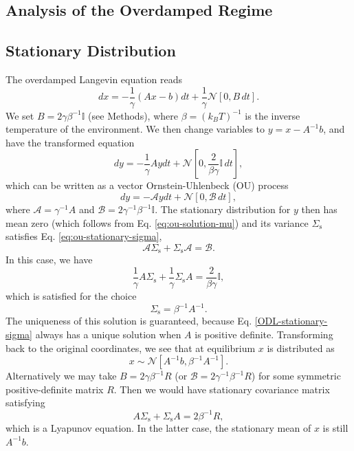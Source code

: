 \documentclass[prx,onecolumn,floatfix,longbibliography,notitlepage, nofootinbib]{revtex4-1}
\begin{document}
\begin{appendix}
\section{Analysis of the Overdamped Regime}

\subsection{Stationary Distribution}
The overdamped Langevin equation reads
\begin{equation}
    \label{eq:ODL-app}
    dx = - \frac{1}{\gamma}(A x - b) dt + \frac{1}{\gamma}\mathcal{N}\left[0,B\, dt\right].
\end{equation}
We set $B = 2 \gamma \beta^{-1} \mathbb{I}$ (see Methods), where $\beta =(k_B T)^{-1}$ is the inverse temperature of the environment. We then change variables to $y = x - A^{-1}b$, and have the transformed equation
\begin{equation}
    \label{ODL-transformed-app}
    dy = - \frac{1}{\gamma}A y dt + \mathcal{N}\left[0, \frac{2}{\beta \gamma} \mathbb{I}\, dt\right],
\end{equation}
which can be written as a vector Ornstein-Uhlenbeck (OU) process \cite{gardiner1985handbook}
\begin{equation}
    \label{ODL-transformed-app}
    dy = - \mathcal{A} y dt + \mathcal{N}[0, \mathcal{B}\, dt],
\end{equation}
where $\mathcal{A} = \gamma^{-1}A$ and $\mathcal{B} = 2 \gamma^{-1}\beta^{-1}\mathbb{I}$. The stationary distribution for $y$ then has mean zero (which follows from Eq. \eqref{eq:ou-solution-mu}) and its variance $\Sigma_\text{s}$ satisfies Eq. \eqref{eq:ou-stationary-sigma},
\begin{equation}
    \mathcal{A} \Sigma_\text{s} + \Sigma_\text{s} \mathcal{A} = \mathcal{B}.
\end{equation}
In this case, we have
\begin{equation}
    \frac{1}{\gamma}A \Sigma_\text{s} + \frac{1}{\gamma}\Sigma_\text{s} A = \frac{2}{\beta \gamma}\mathbb{I},
\end{equation}
which is satisfied for the choice
\begin{equation}
    \label{ODL-stationary-sigma}
    \Sigma_\text{s} = \beta^{-1} A^{-1}.
\end{equation}
The uniqueness of this solution is guaranteed, because Eq. \eqref{ODL-stationary-sigma} always has a unique solution when $A$ is positive definite. Transforming back to the original coordinates, we see that at equilibrium $x$ is distributed as
\begin{equation}
\label{eq:stationary-x-linear-system}
    x \sim \mathcal{N}[A^{-1}b, \beta^{-1} A^{-1}].
\end{equation}
Alternatively we may take $B = 2\gamma\beta^{-1}R$ (or $\mathcal{B} = 2\gamma^{-1} \beta^{-1}R$) for some symmetric positive-definite matrix $R$. Then we would have stationary covariance matrix satisfying
\begin{equation}
    A \Sigma_\text{s} +\Sigma_\text{s} A =2\beta^{-1}R,
\end{equation}
which is a Lyapunov equation. In the latter case, the stationary mean of $x$ is still $A^{-1} b$.

\end{appendix}
\end{document}
